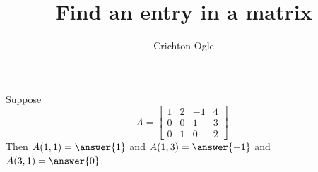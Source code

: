 \documentclass{ximera}
\title{Find an entry in a matrix}
\author{Crichton Ogle}
\begin{document}
\begin{question} Suppose
\[
A = \begin{bmatrix}
1 & 2 & -1 & 4\\
0 & 0 & 1 & 3\\
0 & 1 & 0 & 2
\end{bmatrix}.\]
Then $A(1,1) = \answer{1}$ and $A(1,3) = \answer{-1}$ and $A(3,1) = \answer{0}$.
\end{question}
\end{document}
